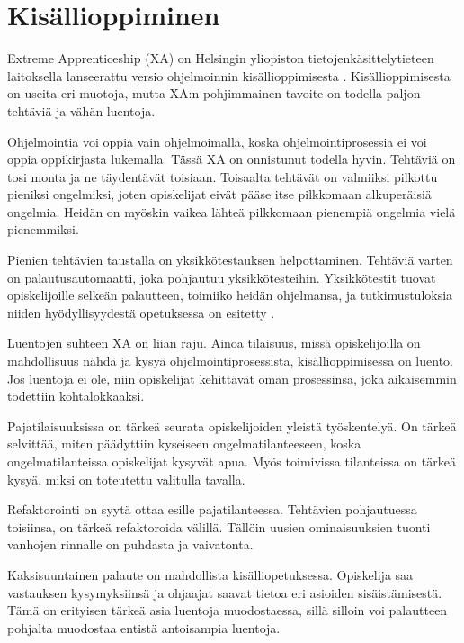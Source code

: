 \section{Kisällioppiminen}

Extreme Apprenticeship (XA) on Helsingin yliopiston tietojenkäsittelytieteen
laitoksella lanseerattu versio ohjelmoinnin kisällioppimisesta
\cite{Vihavainen:2011:EAM:1953163.1953196}. Kisällioppimisesta on useita eri
muotoja, mutta XA:n pohjimmainen tavoite on todella paljon tehtäviä ja vähän
luentoja.

Ohjelmointia voi oppia vain ohjelmoimalla, koska ohjelmointiprosessia ei voi
oppia oppikirjasta lukemalla. Tässä XA on onnistunut todella hyvin. Tehtäviä on
tosi monta ja ne täydentävät toisiaan. Toisaalta tehtävät on valmiiksi pilkottu
pieniksi ongelmiksi, joten opiskelijat eivät pääse itse pilkkomaan alkuperäisiä
ongelmia. Heidän on myöskin vaikea lähteä pilkkomaan pienempiä ongelmia vielä
pienemmiksi.

Pienien tehtävien taustalla on yksikkötestauksen helpottaminen. Tehtäviä varten
on palautusautomaatti, joka pohjautuu yksikkötesteihin. Yksikkötestit tuovat
opiskelijoille selkeän palautteen, toimiiko heidän ohjelmansa, ja
tutkimustuloksia niiden hyödyllisyydestä opetuksessa on esitetty
\cite{Bennedsen:2008}.

Luentojen suhteen XA on liian raju. Ainoa tilaisuus, missä opiskelijoilla on
mahdollisuus nähdä ja kysyä ohjelmointiprosessista, kisällioppimisessa on
luento. Jos luentoja ei ole, niin opiskelijat kehittävät oman prosessinsa, joka
aikaisemmin todettiin kohtalokkaaksi.

Pajatilaisuuksissa on tärkeä seurata opiskelijoiden yleistä työskentelyä. On
tärkeä selvittää, miten päädyttiin kyseiseen ongelmatilanteeseen, koska
ongelmatilanteissa opiskelijat kysyvät apua. Myös toimivissa tilanteissa on
tärkeä kysyä, miksi on toteutettu valitulla tavalla.

Refaktorointi on syytä ottaa esille pajatilanteessa. Tehtävien pohjautuessa
toisiinsa, on tärkeä refaktoroida välillä. Tällöin uusien ominaisuuksien tuonti
vanhojen rinnalle on puhdasta ja vaivatonta.

Kaksisuuntainen palaute on mahdollista kisälliopetuksessa. Opiskelija saa
vastauksen kysymyksiinsä ja ohjaajat saavat tietoa eri asioiden sisäistämisestä.
Tämä on erityisen tärkeä asia luentoja muodostaessa, sillä silloin voi
palautteen pohjalta muodostaa entistä antoisampia luentoja.
